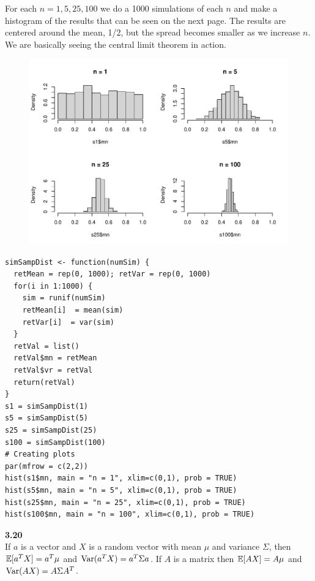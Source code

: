 \medskip\noindent
For each $n=1,5,25,100$ we do a 1000 simulations of each $n$ and make a histogram of the
results that can be seen on the next page.
The results are centered around the mean, 1/2, but the spread becomes smaller
as we increase $n$. We are basically seeing the central limit theorem in action.

\newpage\noindent
\begin{figure}[H]
    \includegraphics[scale = 0.85]{ch3_19.pdf}
\end{figure}
\begin{lstlisting}[style=RSyntax, title=R]
simSampDist <- function(numSim) {
  retMean = rep(0, 1000); retVar = rep(0, 1000)
  for(i in 1:1000) {
    sim = runif(numSim)
    retMean[i]  = mean(sim)
    retVar[i]  = var(sim)
  } 
  retVal = list()
  retVal$mn = retMean
  retVal$vr = retVal
  return(retVal)
} 
s1 = simSampDist(1)
s5 = simSampDist(5)
s25 = simSampDist(25)
s100 = simSampDist(100)
# Creating plots
par(mfrow = c(2,2))
hist(s1$mn, main = "n = 1", xlim=c(0,1), prob = TRUE)
hist(s5$mn, main = "n = 5", xlim=c(0,1), prob = TRUE)
hist(s25$mn, main = "n = 25", xlim=c(0,1), prob = TRUE)
hist(s100$mn, main = "n = 100", xlim=c(0,1), prob = TRUE)
\end{lstlisting}

\newpage\noindent
\textbf{3.20}\\  %
If $a$ is a vector and $X$ is a random vector with mean $\mu$
and variance $\Sigma$, then $\mathbb{E}[a^TX] = a^T\mu$ and
$\text{Var}(a^TX) = a^T\Sigma a$. If $A$ is a matrix then
$\mathbb{E}[AX] = A\mu$ and $\text{Var}(AX) = A\Sigma A^T$.

